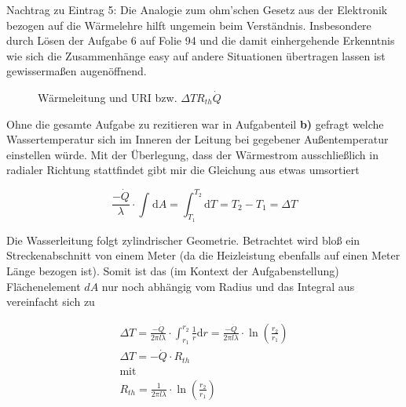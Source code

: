 Nachtrag zu Eintrag 5:
Die Analogie zum ohm'schen Gesetz aus der Elektronik bezogen auf die Wärmelehre hilft ungemein beim Verständnis.
Insbesondere durch Lösen der Aufgabe 6 auf Folie 94 und die damit einhergehende Erkenntnis wie sich die
Zusammenhänge easy auf andere Situationen übertragen lassen ist gewissermaßen augenöffnend.

\begin{figure}[h]
    \centering
    \qquad
    \caption{Wärmeleitung und URI bzw. \(\Delta T R_{th} \dot{Q}\)}
    \label{fig:strom}
\end{figure}

Ohne die gesamte Aufgabe zu rezitieren war in Aufgabenteil \textbf{b)} gefragt welche Wassertemperatur sich im Inneren
der Leitung bei gegebener Außentemperatur einstellen würde. Mit der Überlegung, dass der Wärmestrom ausschließlich in
radialer Richtung stattfindet gibt mir die Gleichung aus  etwas umsortiert

\begin{equation}
    \frac{- \dot Q}{\lambda} \cdot \int_{}^{} \mathrm{d}A = \int_{T_1}^{T_2} \mathrm{d}T = T_2 - T_1 = \Delta T
    \label{eq:1}
\end{equation}

Die Wasserleitung folgt zylindrischer Geometrie. Betrachtet wird bloß ein Streckenabschnitt von einem Meter (da die
Heizleistung ebenfalls auf einen Meter Länge bezogen ist). Somit ist das (im Kontext der Aufgabenstellung)
Flächenelement \(dA\) nur noch abhängig vom Radius und das Integral aus  vereinfacht sich zu

\begin{gather}
    \Delta T = \frac{- \dot Q}{2 \pi l \lambda} \cdot \int_{r_1}^{r_2} \frac{1}{r} \mathrm{d}r = \frac{- \dot Q}{2 \pi l \lambda} \cdot \ln \left(\frac{r_2}{r_1}\right) \nonumber\\
    \Delta T = - \dot{Q} \cdot R_{th}\\
    \text{mit} \nonumber\\
    R_{th} = \frac{1}{2 \pi l \lambda} \cdot \ln \left(\frac{r_2}{r_1}\right)
    \label{eq:2}
\end{gather}

